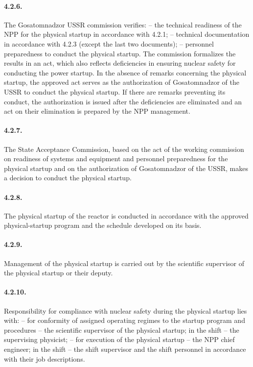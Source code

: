 \documentclass[openright]{bookest}
\begin{document}
\paragraph{4.2.6.} The Gosatomnadzor USSR commission verifies:
-- the technical readiness of the NPP for the physical startup in accordance with 4.2.1;
-- technical documentation in accordance with 4.2.3 (except the last two documents);
-- personnel preparedness to conduct the physical startup.
The commission formalizes the results in an act, which also reflects deficiencies in ensuring nuclear safety for conducting the power startup. In the absence of remarks concerning the physical startup, the approved act serves as the authorization of Gosatomnadzor of the USSR to conduct the physical startup. If there are remarks preventing its conduct, the authorization is issued after the deficiencies are eliminated and an act on their elimination is prepared by the NPP management.

\paragraph{4.2.7.} The State Acceptance Commission, based on the act of the working commission on readiness of systems and equipment and personnel preparedness for the physical startup and on the authorization of Gosatomnadzor of the USSR, makes a decision to conduct the physical startup.

\paragraph{4.2.8.} The physical startup of the reactor is conducted in accordance with the approved physical-startup program and the schedule developed on its basis.

\paragraph{4.2.9.} Management of the physical startup is carried out by the scientific supervisor of the physical startup or their deputy.

\paragraph{4.2.10.} Responsibility for compliance with nuclear safety during the physical startup lies with:
-- for conformity of assigned operating regimes to the startup program and procedures -- the scientific supervisor of the physical startup; in the shift -- the supervising physicist;
-- for execution of the physical startup -- the NPP chief engineer; in the shift -- the shift supervisor and the shift personnel in accordance with their job descriptions.
\end{document}
